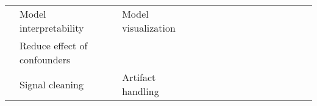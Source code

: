 \begin{tabular}{p{1.5cm}p{1.5cm}p{1.5cm}p{1.5cm}p{0.6cm}p{0.6cm}p{0.6cm}p{0.6cm}p{0.6cm}p{0.6cm}p{0.6cm}p{0.6cm}p{0.6cm}p{0.6cm}p{0.6cm}}
                                & Model interpretability & Model visualization &   &                                                             &                                                                                                        \cite{Hartmann2018b} &                                                                        &                  &                                      &                                                            &                      &      \cite{Sturm2016} &                                 &                         &                                                                      \\
                                & Reduce effect of confounders &   &   &                                                             &                                                                                                                             &                                                                        &                  &                                      &                                                            &                      &                       &                                 &                         &                                                        \cite{Wu2018} \\
                                & Signal cleaning & Artifact handling &   &                                  \cite{Yang2018, Yang2016a} &                                                                                                            \cite{Wang2018a} &                                                                        &                  &                                      &                                     \cite{drouin2016using} &                      &                       &                                 &                         &                                                   \cite{Pardede2015} \\
\bottomrule
\end{tabular}
